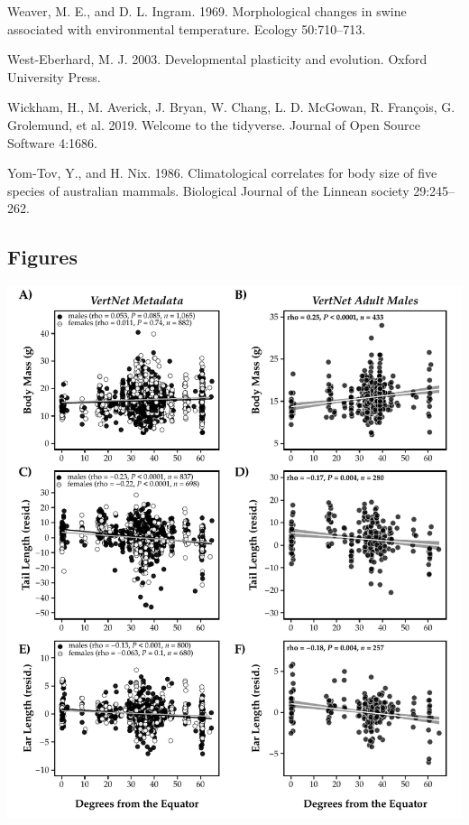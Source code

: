 \documentclass[]{article}
\begin{document}
\leavevmode\hypertarget{ref-Weaver1969}{}%
Weaver, M. E., and D. L. Ingram. 1969. Morphological changes in swine
associated with environmental temperature. Ecology 50:710--713.

\leavevmode\hypertarget{ref-West-Eberhard2003}{}%
West-Eberhard, M. J. 2003. Developmental plasticity and evolution.
Oxford University Press.

\leavevmode\hypertarget{ref-Wickham2019}{}%
Wickham, H., M. Averick, J. Bryan, W. Chang, L. D. McGowan, R. François,
G. Grolemund, et al. 2019. Welcome to the tidyverse. Journal of Open
Source Software 4:1686.

\leavevmode\hypertarget{ref-Yom-Tov1986}{}%
Yom-Tov, Y., and H. Nix. 1986. Climatological correlates for body size
of five species of australian mammals. Biological Journal of the Linnean
society 29:245--262.

\setlength{\parindent}{0in}
\setlength{\leftskip}{0in}

\newpage

\hypertarget{figures}{%
\subsection{Figures}\label{figures}}

\includegraphics{../results/figures/VertNet_all.pdf}
\end{document}
